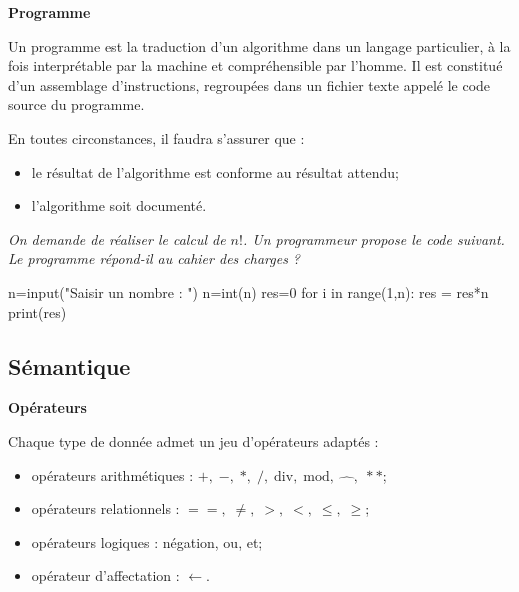 \documentclass[10pt]{article}
\begin{document}
\begin{defi}
\textbf{Programme}

Un programme est la traduction d’un algorithme dans un langage particulier,
à la fois interprétable par la machine et compréhensible par l’homme. Il est constitué
d’un assemblage d’instructions, regroupées dans un fichier texte appelé le code source du
programme.
\end{defi}

\begin{warn}
En toutes circonstances, il faudra s'assurer que : 
\begin{itemize}
\item le résultat de l'algorithme est conforme au résultat attendu;
\item l'algorithme soit documenté. 
\end{itemize}
\end{warn}

\begin{exemple}

\textit{On demande de réaliser le calcul de $n!$. Un programmeur propose le code suivant. Le programme répond-il au cahier des charges ?}


\begin{minipage}[c]{.35\linewidth}
\begin{py}
\begin{python}
n=input("Saisir un nombre : ")
n=int(n)
res=0
for i in range(1,n):
    res = res*n
print(res)
\end{python}
\end{py}
\end{minipage} \hfill
\begin{minipage}[c]{.62\linewidth}
\end{minipage}
\end{exemple}

\subsection{Sémantique}

\begin{defi}
\textbf{Opérateurs}

Chaque type de donnée admet un jeu d’opérateurs adaptés :
\begin{itemize}
\item opérateurs arithmétiques : $+,\; -,\; *,\; /,\; \text{div},\; \text{mod},\; \hat\quad,\; **$;
\item opérateurs relationnels : $==,\; \neq,\; >,\;<,\; \leq,\; \geq$;
\item opérateurs logiques : négation, ou, et;
\item opérateur d'affectation : $\leftarrow$.
\end{itemize}
\end{defi}
\end{document}
